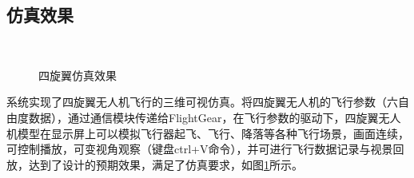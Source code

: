 \subsection{仿真效果}
\begin{figure}[!hbt]
\centering
{}
\\
\caption{\label{fig31} 四旋翼仿真效果 }
\end{figure}

系统实现了四旋翼无人机飞行的三维可视仿真。将四旋翼无人机的飞行参数（六自由度数据），通过通信模块传递给FlightGear，在飞行参数的驱动下，四旋翼无人机模型在显示屏上可以模拟飞行器起飞、飞行、降落等各种飞行场景，画面连续，可控制播放，可变视角观察（键盘ctrl+V命令），并可进行飞行数据记录与视景回放，达到了设计的预期效果，满足了仿真要求，如图\ref{fig31}所示。